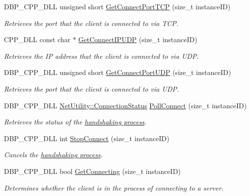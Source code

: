 \begin{DoxyCompactItemize}
DBP\_\-CPP\_\-DLL unsigned short \hyperlink{namespacemn_a54dcaef89c8ec481ba82d1712d2c49f3}{GetConnectPortTCP} (size\_\-t instanceID)
\begin{DoxyCompactList}\small\item\em Retrieves the port that the client is connected to via TCP. \item\end{DoxyCompactList}\item 
CPP\_\-DLL const char $\ast$ \hyperlink{namespacemn_a27b42cb739a01d6c4ec8f368a9f1536e}{GetConnectIPUDP} (size\_\-t instanceID)
\begin{DoxyCompactList}\small\item\em Retrieves the IP address that the client is connected to via UDP. \item\end{DoxyCompactList}\item 
DBP\_\-CPP\_\-DLL unsigned short \hyperlink{namespacemn_a34127d93b6b2ee3724a048a4c4a2d3fe}{GetConnectPortUDP} (size\_\-t instanceID)
\begin{DoxyCompactList}\small\item\em Retrieves the port that the client is connected to via UDP. \item\end{DoxyCompactList}\item 
DBP\_\-CPP\_\-DLL \hyperlink{class_net_utility_a7eae52138f8bd597ffc67ebf07e86b6d}{NetUtility::ConnectionStatus} \hyperlink{namespacemn_a3f6e329576ac7a8c036f2040bd6314a3}{PollConnect} (size\_\-t instanceID)
\begin{DoxyCompactList}\small\item\em Retrieves the status of the \hyperlink{handshake_page}{handshaking process}. \item\end{DoxyCompactList}\item 
DBP\_\-CPP\_\-DLL int \hyperlink{namespacemn_a384075204fa1db1a7fdd21a0219662ba}{StopConnect} (size\_\-t instanceID)
\begin{DoxyCompactList}\small\item\em Cancels the \hyperlink{handshake_page}{handshaking process}. \item\end{DoxyCompactList}\item 
DBP\_\-CPP\_\-DLL bool \hyperlink{namespacemn_a0b816e5fdb5c2dad588d1ab66251cce2}{GetConnecting} (size\_\-t instanceID)
\begin{DoxyCompactList}\small\item\em Determines whether the client is in the process of connecting to a server. \item\end{DoxyCompactList}\item 

\end{DoxyCompactItemize}
